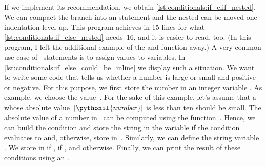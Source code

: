 If we implement its recommendation, we obtain \cref{lst:conditionals:if_elif_nested}.
We can compact the  branch into an  statement and the nested  can be moved one indentation level up.
This program achieves in 15 lines for what \cref{lst:conditionals:if_else_nested} needs~16, and it is easier to read, too.
(In this program, I left the additional example of the  and  function away.)%
%
%
%
\FloatBarrier%
\endhsection%
%
%
\label{sec:inlineIfThenElse}%
%
%
%
%
%
%
%
A very common use case of ~statements is to assign values to variables.
In \cref{lst:conditionals:if_else_could_be_inline} we display such a situation.
We want to write some code that tells us whether a number is large or small and positive or negative.
For this purpose, we first store the number in an integer variable .
As example, we choose the value~.
For the sake of this example, let's assume that a  whose absolute value~$|\pythonil{number}|$ is less than ten should be small.
The absolute value of a number in \python\ can be computed using the function~.
Hence, we can build the condition  and store the string  in the variable  if the condition evaluates to  and, otherwise, store  in~.
Similarly, we can define the string variable .
We store  in  if ,  if , and  otherwise.
Finally, we can print the result of these conditions using an .

